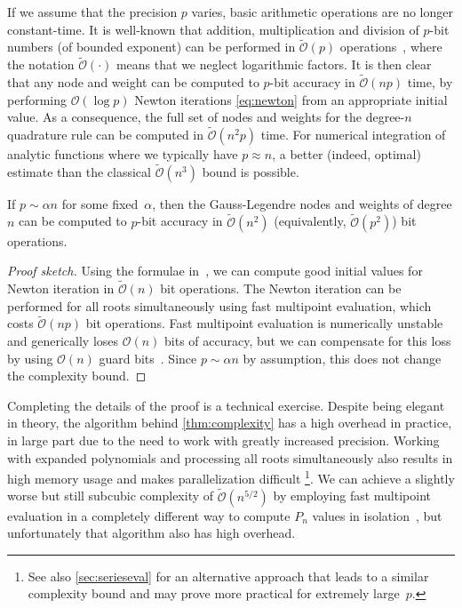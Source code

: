 \documentclass[nohypdvips,review]{siamart0216}
\newcommand{\OO}{\mathcal{O}}
\newcommand{\OOtilde}{\widetilde{\mathcal{O}}}
\begin{document}
If we assume that the precision $p$ varies, basic arithmetic operations
are no longer constant-time.
It is well-known that addition, multiplication and division of $p$-bit
numbers (of bounded exponent) can be performed in
$\OOtilde(p)$ operations~\cite{BrentZimmermann2010},
where the notation $\OOtilde(\cdot)$ means that we neglect logarithmic
factors.
It is then clear that any node and weight
can be computed to $p$-bit accuracy in $\OOtilde(n p)$ time,
by performing $\OO(\log p)$ Newton iterations \cref{eq:newton}
from an appropriate initial value.
As a consequence, the full set of nodes and weights
for the degree-$n$ quadrature rule
can be computed in $\OOtilde(n^2 p)$ time.
For numerical integration of analytic functions
where we typically have $p \approx n$, a better (indeed, optimal) estimate
than the classical $\OOtilde(n^3)$ bound is possible.

\begin{theorem}
\label{thm:complexity}
If $p \sim \alpha n$ for some fixed~$\alpha$, then the Gauss-Legendre
nodes and weights of degree $n$ can be computed to $p$-bit accuracy in
$\OOtilde(n^2)$ (equivalently, $\OOtilde(p^2)$) bit operations.
\end{theorem}

\begin{proof}[Proof sketch]
Using the formulae in~\cite{petras1999computation},
we can compute good initial values for Newton iteration
in $\OOtilde(n)$ bit operations.
The Newton iteration can be performed for all roots
simultaneously using fast multipoint evaluation, which costs
$\OOtilde(n p)$ bit operations.
Fast multipoint evaluation is numerically unstable and
generically loses $\OO(n)$ bits of accuracy, but we can compensate for
this loss by using $\OO(n)$ guard bits~\cite{kobel2013fast}.
Since $p \sim \alpha n$ by assumption, this does not change the
complexity bound.
\end{proof}

Completing the details
of the proof is a technical exercise.
Despite being elegant in theory,
the algorithm behind \cref{thm:complexity} has a high overhead
in practice, in large part due to the need to work
with greatly increased precision.
Working with expanded polynomials and
processing all roots simultaneously also results in high memory usage and
makes parallelization difficult%
\footnote{See also \cref{sec:serieseval} for an alternative approach
that leads to a similar complexity bound and may prove more practical
for extremely large~$p$.}.
We can achieve a slightly worse but still subcubic
complexity of $\OOtilde(n^{5/2})$
by employing
fast multipoint evaluation in a completely different way
to compute $P_n$ values in isolation~\cite{Johansson2014rectangular},
but unfortunately that algorithm also has high overhead.
\end{document}
